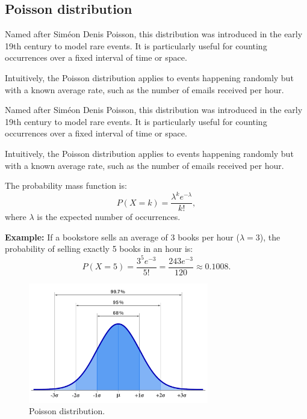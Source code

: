 \documentclass{book}
\begin{document}
\newpage
\subsection{Poisson distribution}
Named after Sim\'eon Denis Poisson, this distribution was introduced in the early 19th century to model rare events. It is particularly useful for counting occurrences over a fixed interval of time or space.

Intuitively, the Poisson distribution applies to events happening randomly but with a known average rate, such as the number of emails received per hour.

Named after Sim\'eon Denis Poisson, this distribution was introduced in the early 19th century to model rare events. It is particularly useful for counting occurrences over a fixed interval of time or space.

Intuitively, the Poisson distribution applies to events happening randomly but with a known average rate, such as the number of emails received per hour.

The probability mass function is:
\begin{equation}
    P(X = k) = \frac{\lambda^k e^{-\lambda}}{k!},
\end{equation}
where $\lambda$ is the expected number of occurrences.

\textbf{Example:} If a bookstore sells an average of 3 books per hour ($\lambda = 3$), the probability of selling exactly 5 books in an hour is:
\begin{equation}
    P(X=5) = \frac{3^5 e^{-3}}{5!} = \frac{243 e^{-3}}{120} \approx 0.1008.
\end{equation}

\begin{figure}[ht]
    \centering
    \includegraphics[width=0.7\textwidth]{figures/gaussian.png}
    \caption{Poisson distribution.}
    \label{fig:random}
\end{figure}
\end{document}
